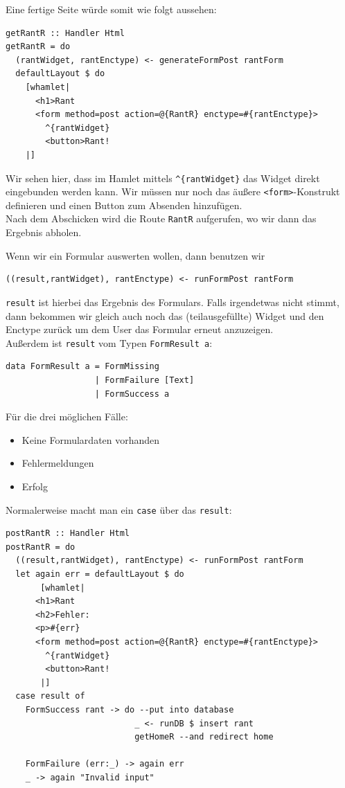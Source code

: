 \documentclass{beamer}
\begin{document}
\begin{frame}[fragile]
Eine fertige Seite würde somit wie folgt aussehen:
\begin{verbatim}
getRantR :: Handler Html
getRantR = do
  (rantWidget, rantEnctype) <- generateFormPost rantForm
  defaultLayout $ do
    [whamlet|
      <h1>Rant
      <form method=post action=@{RantR} enctype=#{rantEnctype}>
        ^{rantWidget}
        <button>Rant!
    |]
\end{verbatim}
\pause
Wir sehen hier, dass im Hamlet mittels \texttt{\textasciicircum\{rantWidget\}} das Widget direkt eingebunden werden kann. Wir müssen nur noch das äußere \texttt{<form>}-Konstrukt definieren und einen Button zum Absenden hinzufügen.\\\pause
Nach dem Abschicken wird die Route \texttt{RantR} aufgerufen, wo wir dann das Ergebnis abholen.

\end{frame}

\begin{frame}[fragile]
Wenn wir ein Formular auswerten wollen, dann benutzen wir
\begin{verbatim}
((result,rantWidget), rantEnctype) <- runFormPost rantForm
\end{verbatim}
\pause
\texttt{result} ist hierbei das Ergebnis des Formulars. Falls irgendetwas nicht stimmt, dann bekommen wir gleich auch noch das (teilausgefüllte) Widget und den Enctype zurück um dem User das Formular erneut anzuzeigen.\\\pause
Außerdem ist \texttt{result} vom Typen \texttt{FormResult a}:
\begin{verbatim}
data FormResult a = FormMissing
                  | FormFailure [Text]
                  | FormSuccess a
\end{verbatim}
\pause
Für die drei möglichen Fälle:
\begin{itemize}
 \item Keine Formulardaten vorhanden
 \item Fehlermeldungen
 \item Erfolg
\end{itemize}
\end{frame}

\begin{frame}[fragile]
Normalerweise macht man ein \texttt{case} über das \texttt{result}:
\begin{verbatim}
postRantR :: Handler Html
postRantR = do
  ((result,rantWidget), rantEnctype) <- runFormPost rantForm
  let again err = defaultLayout $ do
       [whamlet|
      <h1>Rant
      <h2>Fehler:
      <p>#{err}
      <form method=post action=@{RantR} enctype=#{rantEnctype}>
        ^{rantWidget}
        <button>Rant!
       |]
  case result of
    FormSuccess rant -> do --put into database
                          _ <- runDB $ insert rant
                          getHomeR --and redirect home
                 
    FormFailure (err:_) -> again err
    _ -> again "Invalid input"
\end{verbatim}

\end{frame}
\end{document}
